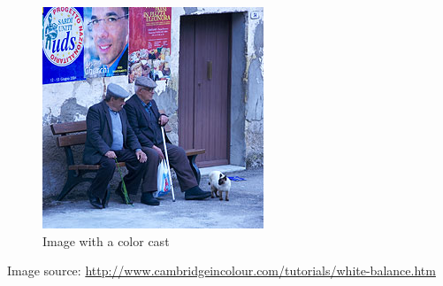 \documentclass[fleqn]{article}
\begin{document}
\begin{figure}[h]
\centering
\includegraphics[scale=0.75]{wb_sardmen-incorrect.jpg}
\caption{\label{fig:color} Image with a color cast}
\end{figure}
Image source: \url{http://www.cambridgeincolour.com/tutorials/white-balance.htm}
\end{document}
